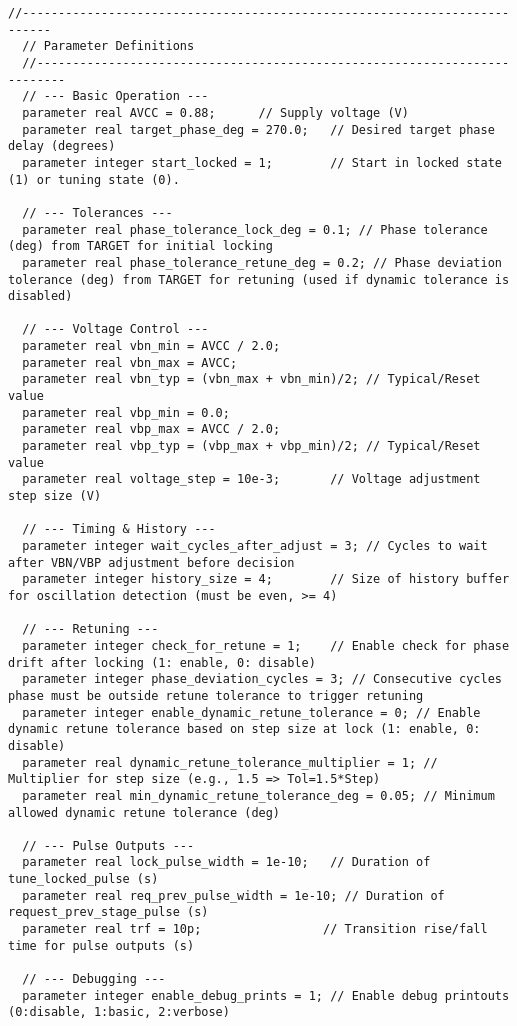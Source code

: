\begin{lstlisting}[caption={Verilog-A Generic Vb Tuner Implementation}]
  //--------------------------------------------------------------------------
  // Parameter Definitions
  //--------------------------------------------------------------------------
  // --- Basic Operation ---
  parameter real AVCC = 0.88;      // Supply voltage (V)
  parameter real target_phase_deg = 270.0;   // Desired target phase delay (degrees)
  parameter integer start_locked = 1;        // Start in locked state (1) or tuning state (0).

  // --- Tolerances ---
  parameter real phase_tolerance_lock_deg = 0.1; // Phase tolerance (deg) from TARGET for initial locking
  parameter real phase_tolerance_retune_deg = 0.2; // Phase deviation tolerance (deg) from TARGET for retuning (used if dynamic tolerance is disabled)

  // --- Voltage Control ---
  parameter real vbn_min = AVCC / 2.0;
  parameter real vbn_max = AVCC;
  parameter real vbn_typ = (vbn_max + vbn_min)/2; // Typical/Reset value
  parameter real vbp_min = 0.0;
  parameter real vbp_max = AVCC / 2.0;
  parameter real vbp_typ = (vbp_max + vbp_min)/2; // Typical/Reset value
  parameter real voltage_step = 10e-3;       // Voltage adjustment step size (V)

  // --- Timing & History ---
  parameter integer wait_cycles_after_adjust = 3; // Cycles to wait after VBN/VBP adjustment before decision
  parameter integer history_size = 4;        // Size of history buffer for oscillation detection (must be even, >= 4)

  // --- Retuning ---
  parameter integer check_for_retune = 1;    // Enable check for phase drift after locking (1: enable, 0: disable)
  parameter integer phase_deviation_cycles = 3; // Consecutive cycles phase must be outside retune tolerance to trigger retuning
  parameter integer enable_dynamic_retune_tolerance = 0; // Enable dynamic retune tolerance based on step size at lock (1: enable, 0: disable)
  parameter real dynamic_retune_tolerance_multiplier = 1; // Multiplier for step size (e.g., 1.5 => Tol=1.5*Step)
  parameter real min_dynamic_retune_tolerance_deg = 0.05; // Minimum allowed dynamic retune tolerance (deg)

  // --- Pulse Outputs ---
  parameter real lock_pulse_width = 1e-10;   // Duration of tune_locked_pulse (s)
  parameter real req_prev_pulse_width = 1e-10; // Duration of request_prev_stage_pulse (s)
  parameter real trf = 10p;                 // Transition rise/fall time for pulse outputs (s)

  // --- Debugging ---
  parameter integer enable_debug_prints = 1; // Enable debug printouts (0:disable, 1:basic, 2:verbose)


\end{lstlisting}
